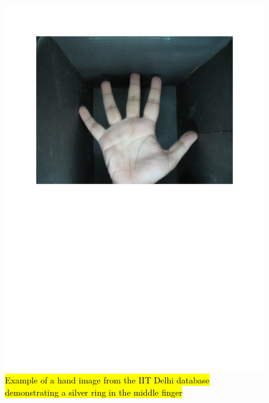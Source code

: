 \documentclass[review]{elsarticle}
\begin{document}
		\begin{figure}[!h]
			\centering
			\includegraphics[page=10,scale=.57,trim=1cm 14.7cm 1cm 1.7cm,clip]{IIT_problematic.pdf}
			\caption{\hl{Example of a hand image from the IIT Delhi database demonstrating a silver ring in the middle finger}}
			\label{fig:IIT_problematic_rings2}
		\end{figure}
\end{document}
